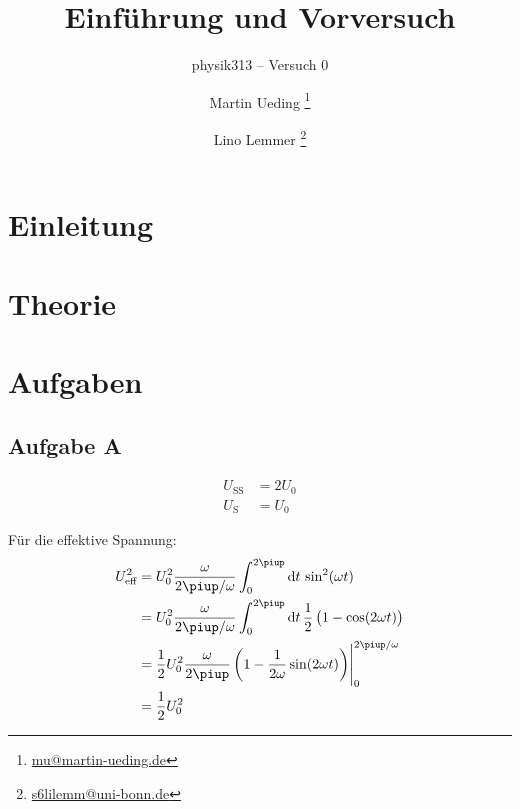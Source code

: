 



\subject{Praktikumsprotokoll}
\title{Einführung und Vorversuch}
\subtitle{physik313 – Versuch 0}
\author{
	Martin Ueding \footnote{\href{mailto:mu@martin-ueding.de}{mu@martin-ueding.de}}
	\and
	Lino Lemmer \footnote{\href{mailto:s6lilemm@uni-bonn.de}{s6lilemm@uni-bonn.de}}
}



\maketitle


\section{Einleitung}

\section{Theorie}

\section{Aufgaben}

\subsection{Aufgabe A}

\begin{align*}
	U_\text{SS}&=2U_0\\
	U_\text{S}&=U_0
\end{align*}

Für die effektive Spannung:
\begin{align*}
	U_\text{eff}^2
	&= U_0^2 \frac{\omega}{2\piup/\omega} \int_0^{2\piup} \dif t \, \sin^2(\omega t) \\
	&= U_0^2 \frac{\omega}{2\piup/\omega} \int_0^{2\piup} \dif t \, \half \del{1- \cos(2\omega t)} \\
	&= \half U_0^2 \frac{\omega}{2\piup} \eval{\del{1- \frac{1}{2\omega} \sin(2\omega t)}}_0^{2\piup/\omega}  \\
	&= \half U_0^2
\end{align*}

